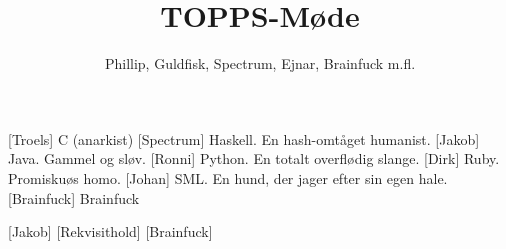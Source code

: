 \documentclass[a4paper,11pt]{article}
\title{TOPPS-M\o{}de}
\author{Phillip, Guldfisk, Spectrum, Ejnar, Brainfuck m.fl.}
\begin{document}
\maketitle

\begin{roles}
[Troels] C (anarkist)
[Spectrum] Haskell. En hash-omt\aa{}get humanist.
[Jakob] Java. Gammel og sl\o{}v.
[Ronni] Python. En totalt overfl\o{}dig slange.
[Dirk] Ruby. Promisku\o{}s homo.
[Johan] SML. En hund, der jager efter sin egen hale.
[Brainfuck] Brainfuck
\end{roles}

\begin{props}
[Jakob]
[Rekvisithold]
[Brainfuck]
\end{props}
\end{document}
